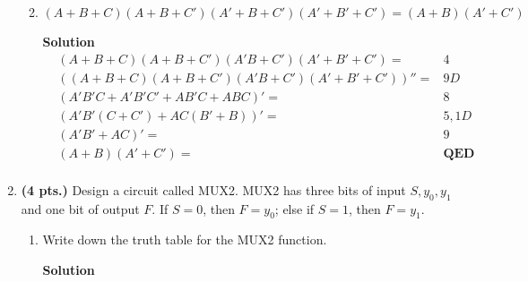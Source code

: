 \begin{enumerate}
\begin{enumerate}
                                \filbreak
                            \item $(A+B+C)(A+B+C')(A'+B+C')(A'+B'+C') = (A+B)(A'+C')$

                                \begin{onlysolution}  \textbf{Solution}
                                    \begin{align*}
                                        &(A+B+C)(A+B+C')(A'B+C')(A'+B'+C')=             & 4\\
                                        &((A+B+C)(A+B+C')(A'B+C')(A'+B'+C'))''=         & 9D\\
                                        &(A'B'C + A'B'C' + AB'C + ABC)'=                & 8\\
                                        &(A'B'(C+C') + AC(B'+B))'=                      & 5, 1D\\
                                        &(A'B' + AC)'=                                  & 9 \\
                                        &(A+B)(A'+C')=                                  & \textbf{{QED}}  \\
                                    \end{align*}
                                \end{onlysolution}
                        \end{enumerate}

                    \item \textbf{ (4 pts.)} Design a circuit called MUX2.  MUX2 has three bits
                        of input $S, y_0, y_1$ and one bit of output $F$.  If $S=0$, then
                        $F=y_0$; else if $S=1$, then $F=y_1$.
                        \begin{enumerate}
                            \item Write down the truth table for the MUX2 function.

                                \begin{onlysolution}  \textbf{Solution} \itshape


\end{onlysolution}
\end{enumerate}
\end{enumerate}
